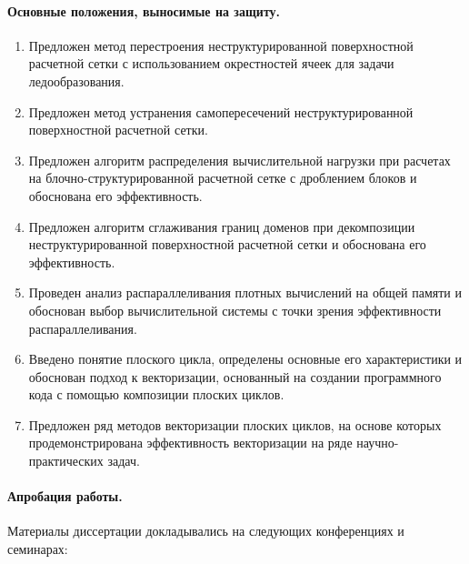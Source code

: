 \documentclass[a4paper,14pt]{extarticle}                     %
\numberwithin{equation}{section}                             %
\numberwithin{figure}{section}                               %
\numberwithin{table}{section}                                %
\theoremstyle{plain}                                         %
\numberwithin{theorem}{section}                              %
\numberwithin{lemma}{section}                                %
\numberwithin{definition}{section}                           %
\begin{document}
\paragraph{Основные положения, выносимые на защиту.}

\begin{enumerate}
\item Предложен метод перестроения неструктурированной поверхностной расчетной сетки с использованием окрестностей ячеек для задачи ледообразования.
\item Предложен метод устранения самопересечений неструктурированной поверхностной расчетной сетки.
\item Предложен алгоритм распределения вычислительной нагрузки при расчетах на блочно-структурированной расчетной сетке с дроблением блоков и обоснована его эффективность.
\item Предложен алгоритм сглаживания границ доменов при декомпозиции неструктурированной поверхностной расчетной сетки и обоснована его эффективность.
\item Проведен анализ распараллеливания плотных вычислений на общей памяти и обоснован выбор вычислительной системы с точки зрения эффективности распараллеливания.
\item Введено понятие плоского цикла, определены основные его характеристики и обоснован подход к векторизации, основанный на создании программного кода с помощью композиции плоских циклов.
\item Предложен ряд методов векторизации плоских циклов, на основе которых продемонстрирована эффективность векторизации на ряде научно-практических задач.
\end{enumerate}

\paragraph{Апробация работы.}

Материалы диссертации докладывались на следующих конференциях и семинарах:
\end{document}
